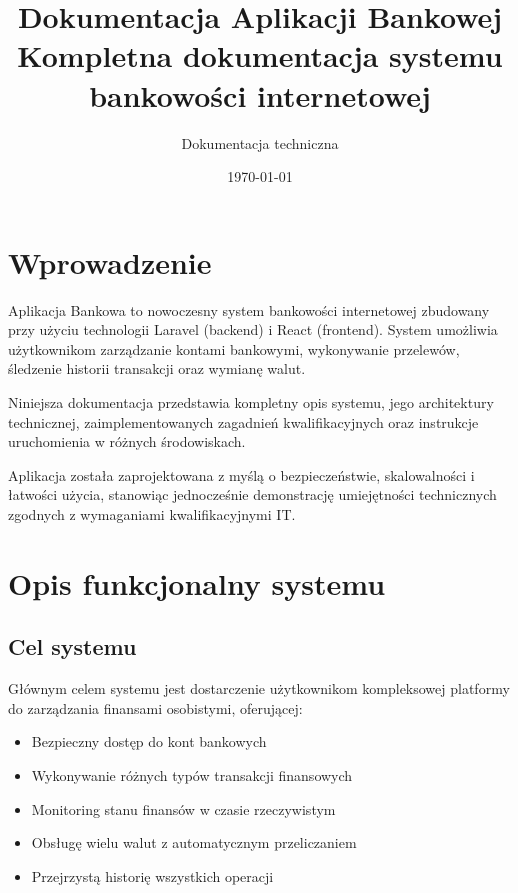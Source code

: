 \documentclass[12pt,a4paper]{article}
\title{\textbf{Dokumentacja Aplikacji Bankowej}\\[0.5cm]\Large Kompletna dokumentacja systemu bankowości internetowej}
\author{Dokumentacja techniczna}
\date{\today}
\begin{document}
    \maketitle
    \thispagestyle{empty}

    \newpage
    \tableofcontents
    \newpage

    \section{Wprowadzenie}

    Aplikacja Bankowa to nowoczesny system bankowości internetowej zbudowany przy użyciu technologii Laravel (backend) i React (frontend). System umożliwia użytkownikom zarządzanie kontami bankowymi, wykonywanie przelewów, śledzenie historii transakcji oraz wymianę walut.

    Niniejsza dokumentacja przedstawia kompletny opis systemu, jego architektury technicznej, zaimplementowanych zagadnień kwalifikacyjnych oraz instrukcje uruchomienia w różnych środowiskach.

    Aplikacja została zaprojektowana z myślą o bezpieczeństwie, skalowalności i łatwości użycia, stanowiąc jednocześnie demonstrację umiejętności technicznych zgodnych z wymaganiami kwalifikacyjnymi IT.

    \section{Opis funkcjonalny systemu}

    \subsection{Cel systemu}

    Głównym celem systemu jest dostarczenie użytkownikom kompleksowej platformy do zarządzania finansami osobistymi, oferującej:
    \begin{itemize}
        \item Bezpieczny dostęp do kont bankowych
        \item Wykonywanie różnych typów transakcji finansowych
        \item Monitoring stanu finansów w czasie rzeczywistym
        \item Obsługę wielu walut z automatycznym przeliczaniem
        \item Przejrzystą historię wszystkich operacji
    \end{itemize}
\end{document}
